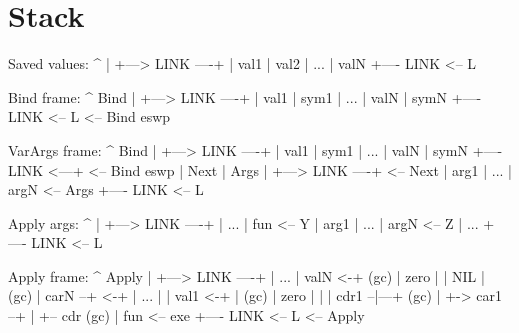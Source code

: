 \section{Stack}
\label{sec:internal-structures-stack}


\begin{wideverbatim}

Saved values:
                  ^
                  |
   +---> LINK ----+
   |     val1
   |     val2
   |     ...
   |     valN
   +---- LINK  <-- L


Bind frame:
                  ^
         Bind     |
   +---> LINK ----+
   |     val1
   |     sym1
   |     ...
   |     valN
   |     symN
   +---- LINK  <-- L <-- Bind
         eswp


\end{wideverbatim}

\begin{wideverbatim}


VarArgs frame:
                  ^
         Bind     |
   +---> LINK ----+
   |     val1
   |     sym1
   |     ...
   |     valN
   |     symN
   +---- LINK <---+  <-- Bind
         eswp     |
         Next     |
         Args     |
   +---> LINK ----+  <-- Next
   |     arg1
   |     ...
   |     argN        <-- Args
   +---- LINK  <-- L



Apply args:
                  ^
                  |
   +---> LINK ----+
   |     ...
   |     fun         <-- Y
   |     arg1
   |     ...
   |     argN        <-- Z
   |     ...
   +---- LINK <-- L


Apply frame:
                  ^
         Apply    |
   +---> LINK ----+
   |     ...
   |     valN <-+       (gc)
   |     zero   |
   |     NIL    |       (gc)
   |     carN --+ <-+
   |     ...        |
   |     val1 <-+   |   (gc)
   |     zero   |   |
   |     cdr1 --|---+   (gc)
   | +-> car1 --+
   | +-- cdr            (gc)
   |     fun         <-- exe
   +---- LINK  <-- L <-- Apply


\end{wideverbatim}

